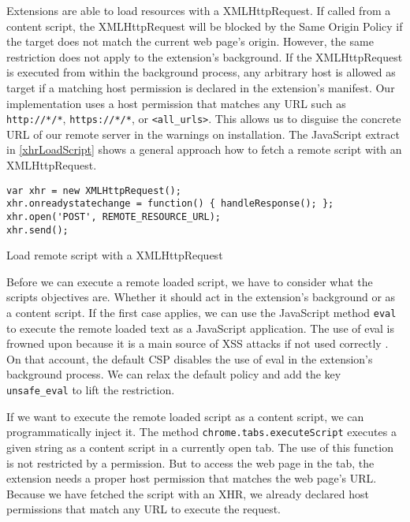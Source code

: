 	Extensions are able to load resources with a XMLHttpRequest. If called from a content script, the XMLHttpRequest will be blocked by the Same Origin Policy if the target does not match the current web page's origin. However, the same restriction does not apply to the extension's background. If the XMLHttpRequest is executed from within the background process, any arbitrary host is allowed as target if a matching host permission is declared in the extension's manifest. Our implementation uses a host permission that matches any URL such as \texttt{http://*/*}, \texttt{https://*/*}, or \texttt{<all\_urls>}. This allows us to disguise the concrete URL of our remote server in the warnings on installation. The JavaScript extract in \autoref{xhrLoadScript} shows a general approach how to fetch a remote script with an XMLHttpRequest. 
	
	\begin{code}
		\begin{lstlisting}
var xhr = new XMLHttpRequest();
xhr.onreadystatechange = function() { handleResponse(); };
xhr.open('POST', REMOTE_RESOURCE_URL);
xhr.send();
\end{lstlisting}
		\caption{Load remote script with a XMLHttpRequest}
		\label{xhrLoadScript}
	\end{code}
	
	Before we can execute a remote loaded script, we have to consider what the scripts objectives are. Whether it should act in the extension's background or as a content script. If the first case applies, we can use the JavaScript method \texttt{eval} to execute the remote loaded text as a JavaScript application. The use of eval is frowned upon because it is a main source of XSS attacks if not used correctly \cite{mozillaDangerousEval}. On that account, the default CSP disables the use of eval in the extension's background process. We can relax the default policy and add the key \texttt{unsafe\_eval} to lift the restriction. 
	
	If we want to execute the remote loaded script as a content script, we can programmatically inject it. The method \texttt{chrome.tabs.executeScript} executes a given string as a content script in a currently open tab. The use of this function is not restricted by a permission. But to access the web page in the tab, the extension needs a proper host permission that matches the web page's URL. Because we have fetched the script with an XHR, we already declared host permissions that match any URL to execute the request.
	
